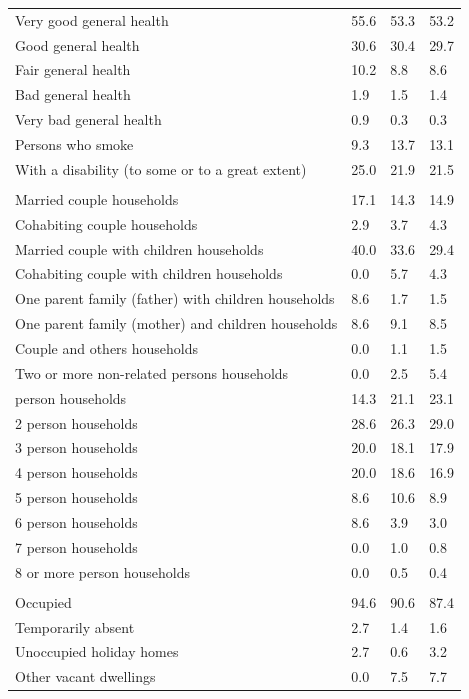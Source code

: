 \documentclass{article}
\begin{document}
\begin{table}[h]
\begin{tabular}{KTTT}
Very good general health & 55.6& 53.3& 53.2\\
Good general health & 30.6& 30.4& 29.7\\
Fair general health & 10.2&  8.8&  8.6\\
Bad general health & 1.9& 1.5& 1.4\\
Very bad general health & 0.9& 0.3& 0.3\\
    \hline
Persons who smoke &  9.3& 13.7& 13.1\\
    \hline
With a disability (to some or to a great extent) & 25.0& 21.9& 21.5\\
\hline
    \\ 
    \hline
Married couple households & 17.1& 14.3& 14.9\\
Cohabiting couple households & 2.9& 3.7& 4.3\\
Married couple with children households & 40.0& 33.6& 29.4\\
Cohabiting couple with children households & 0.0& 5.7& 4.3\\
One parent family (father) with  children households & 8.6& 1.7& 1.5\\
One parent family (mother) and children households & 8.6& 9.1& 8.5\\
Couple and others households  & 0.0& 1.1& 1.5\\
Two or more non-related persons households & 0.0& 2.5& 5.4\\
     person households & 14.3& 21.1& 23.1\\
2 person households & 28.6& 26.3& 29.0\\
3 person households & 20.0& 18.1& 17.9\\
4 person households & 20.0& 18.6& 16.9\\
5 person households &  8.6& 10.6&  8.9\\
6 person households & 8.6& 3.9& 3.0\\
7 person households & 0.0& 1.0& 0.8\\
8 or more person households & 0.0& 0.5& 0.4\\
\hline
    \\ 
    \hline
Occupied & 94.6& 90.6& 87.4\\
Temporarily absent & 2.7& 1.4& 1.6\\
Unoccupied holiday homes & 2.7& 0.6& 3.2\\
Other vacant dwellings & 0.0& 7.5& 7.7\\
\hline
\end{tabular}
\end{table}
\end{document}
